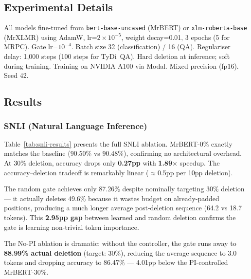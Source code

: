 \documentclass[11pt,a4paper]{article}
\begin{document}
\subsection{Experimental Details}

All models fine-tuned from \texttt{bert-base-uncased} (MrBERT) or \texttt{xlm-roberta-base} (MrXLMR) using AdamW, lr=$2\times10^{-5}$, weight decay=0.01, 3 epochs (5 for MRPC). Gate lr=$10^{-4}$. Batch size 32 (classification) / 16 (QA). Regulariser delay: 1,000 steps (100 steps for TyDi~QA). Hard deletion at inference; soft during training. Training on NVIDIA A100 via Modal. Mixed precision (fp16). Seed 42.


\subsection{Results}

\subsubsection{SNLI (Natural Language Inference)}
\label{sec:results-snli}

Table~\ref{tab:snli-results} presents the full SNLI ablation. MrBERT-0\% exactly matches the baseline (90.50\% vs 90.48\%), confirming no architectural overhead. At 30\% deletion, accuracy drops only \textbf{0.27pp} with \textbf{1.89$\times$} speedup. The accuracy--deletion tradeoff is remarkably linear ($\approx$0.5pp per 10pp deletion).

The random gate achieves only 87.26\% despite nominally targeting 30\% deletion --- it actually deletes 49.6\% because it wastes budget on already-padded positions, producing a much longer average post-deletion sequence (64.2 vs 18.7 tokens). This \textbf{2.95pp gap} between learned and random deletion confirms the gate is learning non-trivial token importance.

The No-PI ablation is dramatic: without the controller, the gate runs away to \textbf{88.99\% actual deletion} (target: 30\%), reducing the average sequence to 3.0 tokens and dropping accuracy to 86.47\% --- 4.01pp below the PI-controlled MrBERT-30\%.
\end{document}
